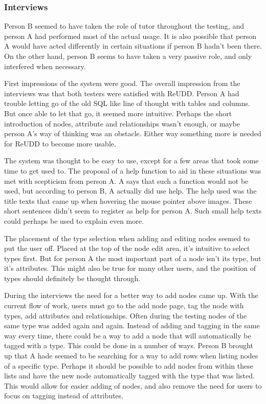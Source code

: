 \documentclass[a4paper]{report}
\begin{document}
\subsubsection{Interviews}
Person B seemed to have taken the role of tutor throughout the testing, and person A had performed most of the actual usage. It is also possible that person A would have acted differently in certain situations if person B hadn't been there. On the other hand, person B seems to have taken a very passive role, and only interfered when necessary.

First impressions of the system were good. The overall impression from the interviews was that both testers were satisfied with ReUDD. Person A had trouble letting go of the old SQL like line of thought with tables and columns. But once able to let that go, it seemed more intuitive. Perhaps the short introduction of nodes, attribute and relationships wasn't enough, or maybe person A's way of thinking was an obstacle. Either way something more is needed for ReUDD to become more usable.

The system was thought to be easy to use, except for a few areas that took some time to get used to. The proposal of a help function to aid in these situations was met with scepticism from person A. A says that such a function would not be used, but according to person B, A actually did use help. The help used was the title texts that came up when hovering the mouse pointer above images. These short sentences didn't seem to register as help for person A. Such small help texts could perhaps be used to explain even more.

The placement of the type selection when adding and editing nodes seemed to put the user off. Placed at the top of the node edit area, it's intuitive to select types first. But for person A the most important part of a node isn't its type, but it's attributes. This might also be true for many other users, and the position of types should definitely be thought through.

During the interviews the need for a better way to add nodes came up. With the current flow of work, users must go to the add node page, tag the node with types, add attributes and relationships. Often during the testing nodes of the same type was added again and again. Instead of adding and tagging in the same way every time, there could be a way to add a node that will automatically be tagged with a type. This could be done in a number of ways. Person B brought up that A hade seemed to be searching for a way to add rows when listing nodes of a specific type. Perhaps it should be possible to add nodes from within these lists and have the new node automatically tagged with the type that was listed. This would allow for easier adding of nodes, and also remove the need for users to focus on tagging instead of attributes.
\end{document}
